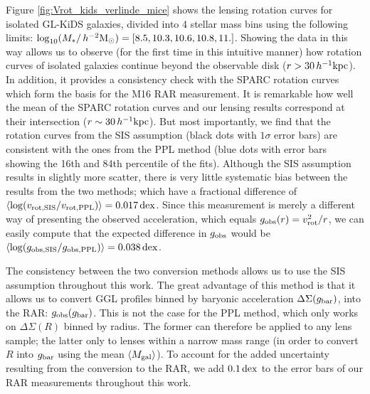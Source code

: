 \documentclass[usenatbib]{mnras}
\newcommand{\hmsun}{\,h^{-2} {\rm M_\odot}}
\newcommand{\hkpc}{\, h^{-1}{\rm{kpc}} }
\newcommand*{\meanb}[1]{\langle{#1}\rangle}
\newcommand{\un}[1]{_{\rm #1}}
\newcommand{\dex}{\, {\rm dex}}
\begin{document}
Figure \ref{fig:Vrot_kids_verlinde_mice} shows the lensing rotation curves for isolated GL-KiDS galaxies, divided into 4 stellar mass bins using the following limits: $\log_{10}(M_*/\hmsun) = [8.5,10.3,10.6,10.8,11.]$. Showing the data in this way allows us to observe (for the first time in this intuitive manner) how rotation curves of isolated galaxies continue beyond the observable disk ($r>30\hkpc$). In addition, it provides a consistency check with the SPARC rotation curves \cite[]{lelli2016b} which form the basis for the M16 RAR measurement. It is remarkable how well the mean of the SPARC rotation curves and our lensing results correspond at their intersection ($r\sim 30 \hkpc$). But most importantly, we find that the rotation curves from the SIS assumption (black dots with $1\sigma$ error bars) are consistent with the ones from the PPL method (blue dots with error bars showing the 16th and 84th percentile of the fits). Although the SIS assumption results in slightly more scatter, there is very little systematic bias between the results from the two methods; which have a fractional difference of $\meanb{\log(v\un{rot, SIS} / v\un{rot, PPL})} = 0.017 \dex$. Since this measurement is merely a different way of presenting the observed acceleration, which equals $g\un{obs}(r) = v\un{rot}^2 / r$, we can easily compute that the expected difference in $g\un{obs}$ would be $\meanb{\log(g\un{obs, SIS} / g\un{obs, PPL})} = 0.038 \dex$.

The consistency between the two conversion methods allows us to use the SIS assumption throughout this work. The great advantage of this method is that it allows us to convert GGL profiles binned by baryonic acceleration $\Delta\Sigma(g\un{bar})$, into the RAR: $g\un{obs}(g\un{bar})$. This is not the case for the PPL method, which only works on $\Delta\Sigma(R)$ binned by radius. The former can therefore be applied to any lens sample; the latter only to lenses within a narrow mass range (in order to convert $R$ into $g\un{bar}$ using the mean $\meanb{M\un{gal}}$). To account for the added uncertainty resulting from the conversion to the RAR, we add $0.1 \dex$ to the error bars of our RAR measurements throughout this work.
\end{document}
